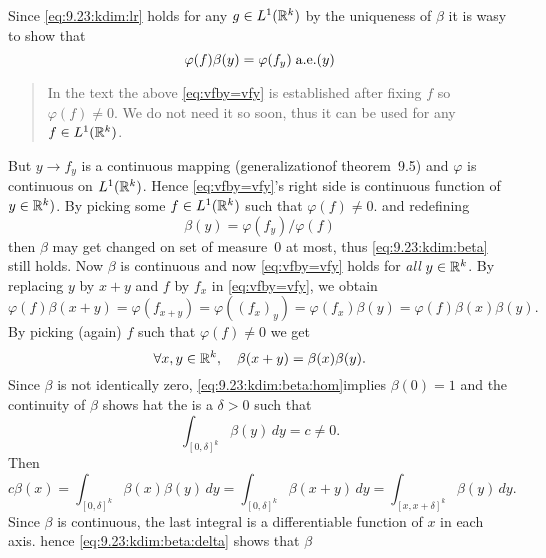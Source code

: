 \begin{enumerate}
\begin{thmproof}
Since  \eqref{eq:9.23:kdim:lr} holds for any \(g\in L^1(\mathbb{R}^k)\)
by the uniqueness of \(\beta\) it is wasy to show that
\begin{equation} \label{eq:vfby=vfy}
\varphi(f)\beta(y) = \varphi(f_y) \; \textrm{a.e.}(y)
\end{equation}
\begin{quotation}
In the text \cite{RudinRCA87} the above \eqref{eq:vfby=vfy}
is established after fixing $f$ so \(\varphi(f)\neq 0\).
We do not need it so soon, thus it can be used for any \(f\in L^1(\mathbb{R}^k)\).
\end{quotation}
But \(y\to f_y\) is a continuous mapping
(generalizationof theorem~9.5) and \(\varphi\) 
is continuous on  \(L^1(\mathbb{R}^k)\).
Hence \eqref{eq:vfby=vfy}'s right side is continuous
function of \(y\in\mathbb{R}^k)\).
By
picking some \(f\in L^1(\mathbb{R}^k)\) such that \(\varphi(f)\neq 0\). 
and redefining 
\begin{equation*}
\beta(y) = \varphi(f_y) / \varphi(f)
\end{equation*}
then \(\beta\) may get changed on set of measure~0 at most, 
thus \eqref{eq:9.23:kdim:beta} still holds. Now \(\beta\) is continuous
and now \eqref{eq:vfby=vfy} holds for \emph{all} \(y\in\mathbb{R}^k\).
By replacing $y$ by \(x+y\) and $f$ by \(f_x\)
in \eqref{eq:vfby=vfy}, we obtain
\begin{equation*}
\varphi(f)\beta(x+y)
= \varphi(f_{x+y})
= \varphi((f_x)_y)
= \varphi(f_x)\beta(y) 
= \varphi(f)\beta(x)\beta(y) .
\end{equation*}
By picking (again) $f$ such that \(\varphi(f)\neq 0\)
we get
\begin{equation} \label{eq:9.23:kdim:beta:hom}
\forall x,y\in\mathbb{R}^k,\quad \beta(x+y) = \beta(x)\beta(y).
\end{equation}
Since \(\beta\) is not identically zero, 
\eqref{eq:9.23:kdim:beta:hom}implies \(\beta(0)=1\)
and the continuity of \(\beta\) shows hat the is a \(\delta>0\)
such that
\begin{equation} %
\int_{[0,\delta]^k}\beta(y)\,dy = c \neq 0.
\end{equation}
Then
\begin{equation} \label{eq:9.23:kdim:beta:delta}
c\beta(x)
= \int_{[0,\delta]^k}\beta(x)\beta(y)\,dy
= \int_{[0,\delta]^k}\beta(x + y)\,dy
= \int_{[x,x+\delta]^k}\beta(y)\,dy.
\end{equation}
Since \(\beta\) is continuous, the last integral is a differentiable
function of $x$ in each axis.
hence \eqref{eq:9.23:kdim:beta:delta} shows that \(\beta\)

\end{thmproof}
\end{enumerate}
